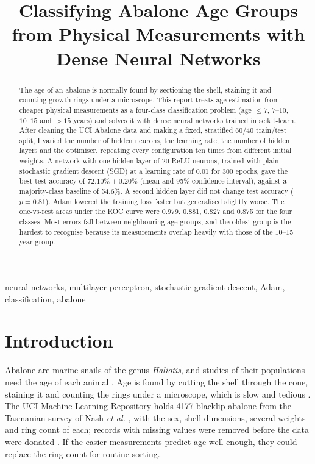 \documentclass[conference]{IEEEtran}
\begin{document}
\title{Classifying Abalone Age Groups from Physical Measurements with Dense Neural Networks}

\author{}

\maketitle

\begin{abstract}
The age of an abalone is normally found by sectioning the shell, staining it and counting growth rings under a microscope. This report treats age estimation from cheaper physical measurements as a four-class classification problem (age $\le 7$, $7$--$10$, $10$--$15$ and $>15$ years) and solves it with dense neural networks trained in scikit-learn. After cleaning the UCI Abalone data and making a fixed, stratified 60/40 train/test split, I varied the number of hidden neurons, the learning rate, the number of hidden layers and the optimiser, repeating every configuration ten times from different initial weights. A network with one hidden layer of 20 ReLU neurons, trained with plain stochastic gradient descent (SGD) at a learning rate of 0.01 for 300 epochs, gave the best test accuracy of $72.10\% \pm 0.20\%$ (mean and 95\% confidence interval), against a majority-class baseline of 54.6\%. A second hidden layer did not change test accuracy ($p = 0.81$). Adam lowered the training loss faster but generalised slightly worse. The one-vs-rest areas under the ROC curve were 0.979, 0.881, 0.827 and 0.875 for the four classes. Most errors fall between neighbouring age groups, and the oldest group is the hardest to recognise because its measurements overlap heavily with those of the 10--15 year group.
\end{abstract}

\begin{IEEEkeywords}
neural networks, multilayer perceptron, stochastic gradient descent, Adam, classification, abalone
\end{IEEEkeywords}

\section{Introduction}

Abalone are marine snails of the genus \emph{Haliotis}, and studies of their populations need the age of each animal \cite{nash1994}. Age is found by cutting the shell through the cone, staining it and counting the rings under a microscope, which is slow and tedious \cite{uci}. The UCI Machine Learning Repository holds 4177 blacklip abalone from the Tasmanian survey of Nash \emph{et al.} \cite{nash1994}, with the sex, shell dimensions, several weights and ring count of each; records with missing values were removed before the data were donated \cite{uci}. If the easier measurements predict age well enough, they could replace the ring count for routine sorting.
\end{document}

